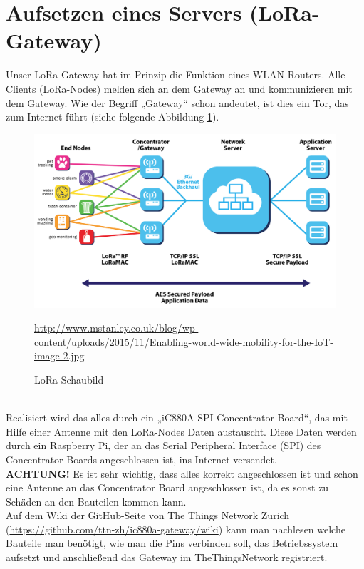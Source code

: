 \section{Aufsetzen eines Servers (LoRa-Gateway)}
Unser LoRa-Gateway hat im Prinzip die Funktion eines WLAN-Routers. Alle Clients (LoRa-Nodes) melden sich an dem Gateway an und kommunizieren mit dem Gateway. Wie der Begriff „Gateway“ schon andeutet, ist dies ein Tor, das zum Internet führt (siehe folgende Abbildung \ref{fig:lora-schaubild}).
\begin{figure}[ht]
    \center
    \includegraphics[width=15cm]{Bilder/lora-schaubild.jpg}\\
    \caption{LoRa Schaubild}
    \begin{center} \quelle\url{http://www.mstanley.co.uk/blog/wp-content/uploads/2015/11/Enabling-world-wide-mobility-for-the-IoT-image-2.jpg} \end{center}
    \label{fig:lora-schaubild}
\end{figure}\\
Realisiert wird das alles durch ein „iC880A-SPI Concentrator Board“, das mit Hilfe einer Antenne mit den LoRa-Nodes Daten austauscht. Diese Daten werden durch ein Raspberry Pi, der an das Serial Peripheral Interface (SPI) des Concentrator Boards angeschlossen ist, ins Internet versendet.\\
\textbf{ACHTUNG!} Es ist sehr wichtig, dass alles korrekt angeschlossen ist und schon eine Antenne an das Concentrator Board angeschlossen ist, da es sonst zu Schäden an den Bauteilen kommen kann. \\
Auf dem Wiki der GitHub-Seite von The Things Network Zurich (\url{https://github.com/ttn-zh/ic880a-gateway/wiki}) kann man nachlesen welche Bauteile man benötigt, wie man die Pins verbinden soll, das Betriebssystem aufsetzt und anschließend das Gateway im TheThingsNetwork registriert.\\

